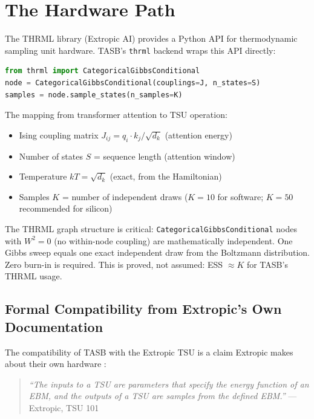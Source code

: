 \documentclass[11pt,a4paper]{article}
\begin{document}
\section{The Hardware Path}
\label{sec:hardware}

The THRML library (Extropic AI) provides a Python API for thermodynamic sampling
unit hardware. TASB's \texttt{thrml} backend wraps this API directly:

\begin{lstlisting}[language=Python, caption={TASB THRML backend (hardware-ready).}]
from thrml import CategoricalGibbsConditional
node = CategoricalGibbsConditional(couplings=J, n_states=S)
samples = node.sample_states(n_samples=K)
\end{lstlisting}

The mapping from transformer attention to TSU operation:
\begin{itemize}[nosep]
  \item Ising coupling matrix $J_{ij} = q_i \cdot k_j / \sqrt{d_k}$ (attention energy)
  \item Number of states $S$ = sequence length (attention window)
  \item Temperature $kT = \sqrt{d_k}$ (exact, from the Hamiltonian)
  \item Samples $K$ = number of independent draws ($K=10$ for software; $K=50$ recommended for silicon)
\end{itemize}

The THRML graph structure is critical: \texttt{CategoricalGibbsConditional} nodes
with $W^2 = 0$ (no within-node coupling) are mathematically independent. One Gibbs
sweep equals one exact independent draw from the Boltzmann distribution. Zero
burn-in is required. This is proved, not assumed: ESS $\approx K$ for TASB's
THRML usage.

\subsection{Formal Compatibility from Extropic's Own Documentation}

The compatibility of TASB with the Extropic TSU is a claim Extropic makes about
their own hardware \citep{extropic_tsu101, extropic_codon2026}:

\begin{quote}
\textit{``The inputs to a TSU are parameters that specify the energy function of
an EBM, and the outputs of a TSU are samples from the defined EBM.''} ---
Extropic, TSU 101
\end{quote}
\end{document}
